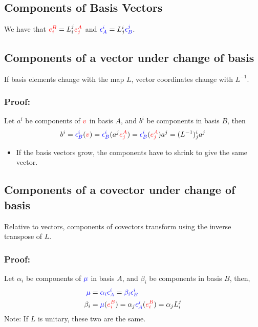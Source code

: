 \documentclass[10pt]{article}
\begin{document}
\subsection*{Components of Basis Vectors}
We have that $\textcolor{red}{e_i^B} = L_i^j \textcolor{red}{e_j^A}$ and $\textcolor{blue}{\epsilon_A^i} = L_j^i \textcolor{blue}{\epsilon_B^j}$.

\subsection*{Components of a vector under change of basis}
If basis elements change with the map $L$, vector coordinates change with $L^{-1}$.
\subsubsection*{Proof:}
Let $a^i$ be components of $\textcolor{red}{v}$ in basis $A$, and $b^i$ be components in basis $B$, then
\[b^i = \textcolor{blue}{\epsilon_B^i}(\textcolor{red}{v}) = \textcolor{blue}{\epsilon_B^i}(a^j \textcolor{red}{e_j^A}) = \textcolor{blue}{\epsilon_B^i}(\textcolor{red}{e_j^A}) a^j = (L^{-1})_j^i a^j\]
\begin{itemize}
    \item If the basis vectors grow, the components have to shrink to give the same vector.
\end{itemize}

\subsection*{Components of a covector under change of basis}
Relative to vectors, components of covectors transform using the inverse transpose of $L$.
\subsubsection*{Proof:}
Let $\alpha_i$ be components of $\textcolor{blue}{\mu}$ in basis $A$, and $\beta_i$ be components in basis $B$, then,
\begin{align*}
    \textcolor{blue}{\mu} &= \textcolor{blue}{\alpha_i \epsilon_A^i} = \textcolor{blue}{\beta_i \epsilon_B^i}\\
    \beta_i &= \textcolor{blue}{\mu}(\textcolor{red}{e_i^B}) = \alpha_j \textcolor{blue}{\epsilon_A^j}(\textcolor{red}{e_i^B}) = \alpha_j L_i^j
\end{align*}
Note: If $L$ is unitary, these two are the same.
\end{document}
